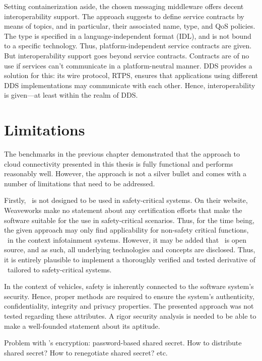 Setting containerization aside, the chosen messaging middleware offers decent interoperability support. The approach suggests to define service contracts by means of topics, and in particular, their associated name, type, and QoS policies. The type is specified in a language-independent format (IDL), and is not bound to a specific technology. Thus, platform-independent service contracts are given. But interoperability support goes beyond service contracts. Contracts are of no use if services can't communicate in a platform-neutral manner. DDS provides a solution for this: its wire protocol, RTPS, ensures that applications using different DDS implementations may communicate with each other. Hence, interoperability is given---at least within the realm of DDS. 



\section{Limitations}

The benchmarks in the previous chapter demonstrated that the approach to cloud connectivity presented in this thesis is fully functional and performs reasonably well. However, the approach is not a silver bullet and comes with a number of limitations that need to be addressed.

Firstly, \wnet\ is not designed to be used in safety-critical systems. On their website, Weaveworks make no statement about any certification efforts that make the software suitable for the use in safety-critical scenarios. Thus, for the time being, the given approach may only find applicability for non-safety critical functions, \eg\ in the context infotainment systems. However, it may be added that \wnet\ is open source, and as such, all underlying technologies and concepts are disclosed. Thus, it is entirely plausible to implement a thoroughly verified and tested derivative of \wnet\ tailored to safety-critical systems.

In the context of vehicles, safety is inherently connected to the software system's security. Hence, proper methods are required to ensure the system's authenticity, confidentiality, integrity and privacy properties. The presented approach was not tested regarding these attributes. A rigor security analysis is needed to be able to make a well-founded statement about its aptitude.

Problem with \wnet 's encryption: password-based shared secret. How to distribute shared secret? How to renegotiate shared secret? etc.

